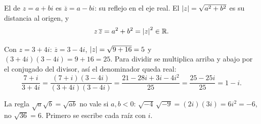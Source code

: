 \documentclass[11pt,a4paper]{article}
\newcommand{\conj}[1]{\overline{#1}}
\DeclareMathOperator{\Ree}{Re}
\begin{document}
\begin{minipage}[c]{0.6\linewidth}
\begin{definicion}
El  de $z=a+bi$ es $\conj z=a-bi$: su reflejo en el eje real. El  $\left\lvert z\right\rvert=\sqrt{a^2+b^2}$
es su distancia al origen, y
\[ z\,\conj z=a^2+b^2=\abs z^{2}\in\R . \]
\end{definicion}
\end{minipage}\hfill
\begin{minipage}[c]{0.36\linewidth}\centering
{}
\end{minipage}

\begin{ejemplo}
Con $z=3+4i$: $\conj z=3-4i$, $\left\lvert z\right\rvert=\sqrt{9+16}=5$ y $(3+4i)(3-4i)=9+16=25$. Para dividir se multiplica arriba y
abajo por el conjugado del divisor, así el denominador queda real:
\[ \frac{7+i}{3+4i}=\frac{(7+i)(3-4i)}{(3+4i)(3-4i)}=\frac{21-28i+3i-4i^2}{25}=\frac{25-25i}{25}=1-i . \]
\end{ejemplo}
\begin{ojo}
La regla $\sqrt{a}\sqrt{b}=\sqrt{ab}$ no vale si $a,b<0$: $\sqrt{-4}\,\sqrt{-9}=(2i)(3i)=6i^2=-6$, no $\sqrt{36}=6$.
Primero se escribe cada raíz con $i$.
\end{ojo}

\end{document}
